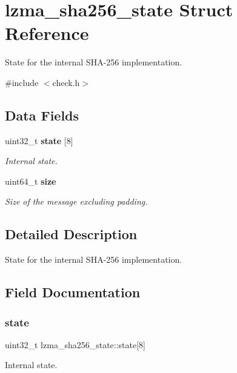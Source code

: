 \section{lzma\+\_\+sha256\+\_\+state Struct Reference}
\label{structlzma__sha256__state}


State for the internal S\+H\+A-\/256 implementation.  




{\ttfamily \#include $<$check.\+h$>$}

\subsection*{Data Fields}
\begin{DoxyCompactItemize}
\item 
uint32\+\_\+t \textbf{ state} [8]
\begin{DoxyCompactList}\small\item\em Internal state. \end{DoxyCompactList}\item 
uint64\+\_\+t \textbf{ size}
\begin{DoxyCompactList}\small\item\em Size of the message excluding padding. \end{DoxyCompactList}\end{DoxyCompactItemize}


\subsection{Detailed Description}
State for the internal S\+H\+A-\/256 implementation. 

\subsection{Field Documentation}
\mbox{\label{structlzma__sha256__state_adb885aab736aae3772761f6c663c40be}} 
\subsubsection{state}
{\footnotesize\ttfamily uint32\+\_\+t lzma\+\_\+sha256\+\_\+state\+::state[8]}



Internal state. 



